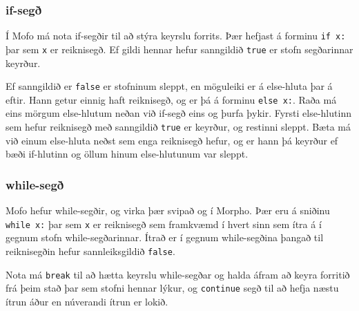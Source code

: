 \documentclass[12pt,a4paper]{article}
\begin{document}
\subsubsection{if-segð}
Í Mofo má nota if-segðir til að stýra keyrslu forrits. Þær hefjast á forminu {\tt if x:} þar sem {\tt x} er reiknisegð. Ef gildi hennar hefur sanngildið {\tt true} er stofn
segðarinnar keyrður.

Ef sanngildið er {\tt false} er stofninum sleppt, en möguleiki er á else-hluta þar á eftir. Hann getur einnig haft reiknisegð, og er þá á forminu {\tt else x:}. Raða má
eins mörgum else-hlutum neðan við if-segð eins og þurfa þykir. Fyrsti else-hlutinn sem hefur reiknisegð með sanngildið {\tt true} er keyrður, og restinni sleppt. Bæta má
við einum else-hluta neðst sem enga reiknisegð hefur, og er hann þá keyrður ef bæði if-hlutinn og öllum hinum else-hlutunum var sleppt.

\subsubsection{while-segð}
Mofo hefur while-segðir, og virka þær svipað og í Morpho. Þær eru á sniðinu {\tt while x:} þar sem {\tt x} er reiknisegð sem framkvæmd í hvert sinn sem ítra á í gegnum stofn
while-segðarinnar. Ítrað er í gegnum while-segðina þangað til reiknisegðin hefur sannleiksgildið {\tt false}.

Nota má {\tt break} til að hætta keyrslu while-segðar og halda áfram að keyra forritið frá þeim stað þar sem stofni hennar lýkur, og {\tt continue} segð til að hefja næstu ítrun
áður en núverandi ítrun er lokið.
\end{document}
